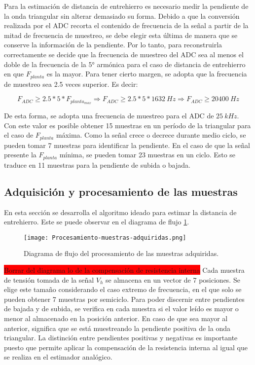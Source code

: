 Para la estimación de distancia de entrehierro es necesario medir la pendiente de la onda triangular sin alterar demasiado su forma. Debido a que la conversión realizada por el ADC recorta el contenido de frecuencia de la señal a partir de la mitad de frecuencia de muestreo, se debe elegir esta última de manera que se conserve la información de la pendiente.  Por lo tanto, para reconstruirla correctamente se decide que la frecuencia de muestreo del ADC sea al menos el doble de la frecuencia de la 5° armónica para el caso de distancia de entrehierro en que $F_{planta}$ es la mayor. Para tener cierto margen, se adopta que la frecuencia de muestreo sea 2.5 veces superior. Es decir:

\begin{equation} 
	F_{ADC} \geq 2.5 * 5 * F_{planta_{max}} \Rightarrow  F_{ADC} \geq 2.5 * 5 * 1632\:Hz \Rightarrow F_{ADC} \geq 20400\:Hz
\end{equation}


 De esta forma, se adopta una frecuencia de muestreo para el ADC de  $25\:kHz$. Con este valor es posible obtener 15 muestras en un período de la triangular para el caso de $F_{planta}$ máxima. Como la señal crece o decrece durante medio ciclo, se pueden tomar 7 muestras para identificar la pendiente. En el caso de que la señal presente la $F_{planta}$ mínima, se pueden tomar 23 muestras en un ciclo. Esto se traduce en 11 muestras para la pendiente de subida o bajada. 


\subsection{Adquisición y procesamiento de las muestras} \label{sec_adquisicion_y_procesamiento}

En esta sección se desarrolla el algoritmo ideado para estimar la distancia de entrehierro. Este se puede observar en el diagrama de flujo \ref{fig:procesamiento-muestras-adquiridas}.

\begin{figure}[H]
	\centering
	\texttt{[image: Procesamiento-muestras-adquiridas.png]}
	\caption{ Diagrama de flujo del procesamiento de las muestras adquiridas.}
	\label{fig:procesamiento-muestras-adquiridas}
\end{figure}

\colorbox{red}{Borrar del diagrama lo de la compensación de resistencia interna}
Cada muestra de tensión tomada de la señal $V_h$ se almacena en un vector de 7 posiciones. Se elige este tamaño considerando el caso extremo de frecuencia, en el que solo se pueden obtener 7 muestras por semiciclo. Para poder discernir entre pendientes de bajada y de subida, se verifica en cada muestra si el valor leído es mayor o menor al almacenado en la posición anterior. En caso de que sea mayor al anterior, significa que se está muestreando la pendiente positiva de la onda triangular. La distinción entre pendientes positivas y negativas es importante puesto que permite aplicar la compensación de la resistencia interna al igual que se realiza en el estimador analógico. 

